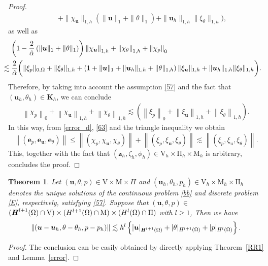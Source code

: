 \documentclass[10pt,a4paper]{article}
\newtheorem{theorem} {\bf Theorem}
\begin{document}
\begin{proof}
\begin{align*}
  &\quad + \|\chi_{\boldsymbol{u}}\|_{1,h} \left(\| \boldsymbol{u} \|_{1}    + \| \theta \|_{1} \right) + \| \boldsymbol{u}_h \|_{1,h} \| \xi_{\theta} \|_{1,h}  \bigg),
\end{align*}
as well as
 \begin{align*}
& \left( 1- \frac{2}{\hat{\alpha}} \left(\| \boldsymbol{u} \|_{1}    + \| \theta \|_{1} \right) \right)  \left\|\chi_{\boldsymbol{u}}\right\|_{1,h} +  \left\|\chi_{\theta}\right\|_{1,h} + \left\|\chi_p\right\|_{0} \\
& \hspace{-4mm} \lesssim \frac{2}{\hat{\alpha}} \bigg(  \| \xi_p\|_{0,\Omega} + \| \xi_{\theta} \|_{1,h} +  \left( 1+ \| \boldsymbol{u} \|_{1} + \| \boldsymbol{u}_h \|_{1,h} +  \| \theta \|_{1,h} \right) \|\xi_{\boldsymbol{u}}\|_{1,h} + \| \boldsymbol{u}_h \|_{1,h} \| \xi_{\theta} \|_{1,h}  \bigg).
\end{align*}
  			Therefore, by taking into account the assumption \eqref{57} and the fact that $(\boldsymbol{u}_h, \theta_h) \in \boldsymbol{K}_h$, we can conclude
  			\begin{align}\label{63}
  			\left\|\chi_p\right\|_{0}+\left\|\chi_{\boldsymbol{u}}\right\|_{1,h} +\left\|\chi_{\theta}\right\|_{1,h} \lesssim \left(\left\|\xi_p\right\|_{0}+\left\|\xi_{\boldsymbol{u}}\right\|_{1,h} + \left\| \xi_{\theta}\right\|_{1,h}\right).
  			\end{align}
            In this way, from \eqref{error_d}, \eqref{63} and the triangle inequality we obtain
  			$$
  			\left\|\left(\boldsymbol{e}_p, \boldsymbol{e}_{\boldsymbol{u}},  \boldsymbol{e}_{\theta} \right)\right\| \leq\left\|\left(\chi_p, \chi_{\boldsymbol{u}}, \chi_{\theta}\right)\right\|+\left\|\left({\xi}_p, {\xi}_{\boldsymbol{u}}, \xi_{\theta}\right)\right\| \lesssim \left\|\left({\xi}_p, {\xi}_{\mathrm{u}}, \xi_{\theta}\right)\right\|.
  			$$
  		This, together with the fact that  $\left(\boldsymbol{z}_h,\zeta_h, \phi_h \right) \in \mathrm{V}_h \times \mathrm{\Pi}_h \times \mathrm{M}_h $ is arbitrary, concludes the proof.
  		\end{proof}
  		\begin{theorem}\label{101}
  			Let $(\boldsymbol{u},\theta, p) \in \mathrm{V} \times \mathrm{M} \times \Pi$ and $\left( \boldsymbol{u}_h, \theta_h, p_h\right) \in \mathrm{V}_h \times \mathrm{M}_h\times \mathrm{\Pi}_h$ denotes the unique solutions of the continuous problem \eqref{bb} and discrete problem \eqref{E}, respectively,  satisfying \eqref{57}. Suppose that
  			$(\boldsymbol{u},\theta,p) \in$ $  (\textbf{\textit{H}}^{l+1}(\Omega) \cap \mathrm{V}) \times ({H}^{l+1}(\Omega) \cap \mathrm{M}) \times ({H}^l(\Omega) \cap \Pi)$ with $l \geq 1$, Then we have 
  			$$
  			\left\|\left( \boldsymbol{u}-\boldsymbol{u}_h,\theta- \theta_h,p-p_h\right)\right\| \lesssim  h^{l}\left\{|\boldsymbol{u}|_{\textbf{\textit{H}}^{l+1}(\Omega)}+ |\theta|_{H^{l+1}(\Omega)}+|p|_{{H}^{l}(\Omega)}\right\}.
  			$$
  		\end{theorem}
  		\begin{proof}
  			The conclusion can be easily obtained by directly applying Theorem~\ref{RR1} and Lemma~\ref{error}.
  		\end{proof}
\end{document}
